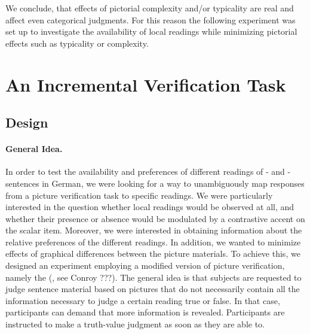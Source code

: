 \documentclass[fleqn,reqno,10pt,draft]{article}
\newcommand{\as}{\acro{as}}
\renewcommand{\es}{\acro{es}}
\begin{document}
We conclude, that  effects of pictorial complexity and/or typicality are real and affect even categorical judgments. For this reason the following experiment was set up to investigate the availability of local readings while minimizing pictorial effects such as typicality or complexity. 




\section{An Incremental Verification Task}
\label{sec:exp}

\subsection{Design}
\label{sec:design}

\paragraph{General Idea.} In order to test the availability and
preferences of different readings of \as- and \es-sentences in German, 
we were looking for a way to unambiguously map responses from a picture
verification task to specific readings. We were particularly
interested in the question whether local readings would be observed at
all, and whether their presence or absence would be modulated by
a contrastive accent on the scalar item. Moreover, we were  
interested in obtaining information about the relative preferences 
of the different readings. In addition, we wanted
to minimize effects of graphical differences between the picture
materials. To achieve this, we designed an experiment employing a
modified version of picture verification, namely the
 (, see Conroy
???). The general idea is that subjects are requested to judge
sentence material based on pictures that do not necessarily contain
all the information necessary to judge a certain reading true or
false. In that case, participants can demand that more information is
revealed. Participants are instructed to make a truth-value judgment
as soon as they are able to.
\end{document}
